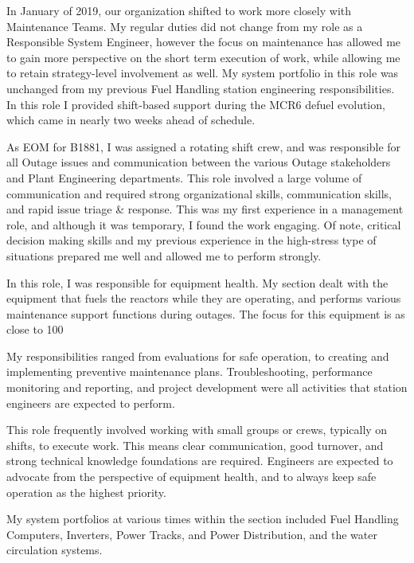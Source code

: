 \documentclass{my_cv}
\begin{document}

In January of 2019, our organization shifted to work more closely with Maintenance Teams. My regular duties did not change from my role as a Responsible System Engineer, however the focus on maintenance has allowed me to gain more perspective on the short term execution of work, while allowing me to retain strategy-level involvement as well. My system portfolio in this role was unchanged from my previous Fuel Handling station engineering responsibilities. In this role I provided shift-based support during the MCR6 defuel evolution, which came in nearly two weeks ahead of schedule.

As EOM for B1881, I was assigned a rotating shift crew, and was responsible for all Outage issues and communication between the various Outage stakeholders and Plant Engineering departments. This role involved a large volume of communication and required strong organizational skills, communication skills, and rapid issue triage \& response. This was my first experience in a management role, and although it was temporary, I found the work engaging. Of note, critical decision making skills and my previous experience in the high-stress type of situations prepared me well and allowed me to perform strongly.


In this role, I was responsible for equipment health. My section dealt with the equipment that fuels the reactors while they are operating, and performs various maintenance support functions during outages. The focus for this equipment is as close to 100%

My responsibilities ranged from evaluations for safe operation, to creating and implementing preventive maintenance plans. Troubleshooting, performance monitoring and reporting, and project development were all activities that station engineers are expected to perform.

This role frequently involved working with small groups or crews, typically on shifts, to execute work. This means clear communication, good turnover, and strong technical knowledge foundations are required. Engineers are expected to advocate from the perspective of equipment health, and to always keep safe operation as the highest priority.

My system portfolios at various times within the section included Fuel Handling Computers, Inverters, Power Tracks, and Power Distribution, and the water circulation systems.
\end{document}
